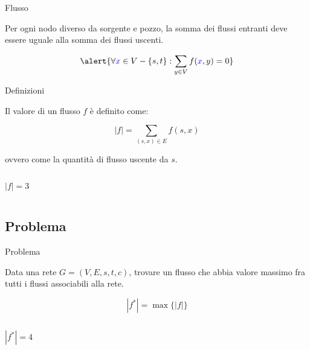 \begin{frame}{Flusso}

\vspace{-9pt}
\begin{myboxtitle}
Per ogni nodo diverso da sorgente e pozzo, la somma dei flussi entranti deve essere uguale alla somma dei flussi uscenti.

\[
\alert{\forall \textcolor{blue}{x} \in V-\{s,t\}: \sum_{y \in V} f(\textcolor{blue}{x}, y) = 0}
\]
\end{myboxtitle}

\smallskip
\begin{center}
\end{center}

\end{frame}

\begin{frame}{Definizioni}

\vspace{-9pt}
\begin{myboxtitle}
Il \alert{valore di un flusso} $f$ è definito come:

\[
  |f| = \sum_{(s, x) \in E} f(s, x)
\]

ovvero come la quantità di flusso uscente da $s$.
\end{myboxtitle}

\begin{columns}[T]
\[|f| = 3\]
\vspace{-12pt}
\end{columns}

\end{frame}

\subsection{Problema}

\begin{frame}{Problema}

\vspace{-9pt}
\begin{myboxtitle}
Data una rete $G=(V,E,s,t,c)$, trovare un flusso che abbia valore massimo fra 
tutti i flussi associabili alla rete.

\[
  |f^*| = \max \{ |f| \}
\]
\end{myboxtitle}

\begin{columns}[T]
\[|f^*| = 4\]
\vspace{-12pt}
\end{columns}

\end{frame}

